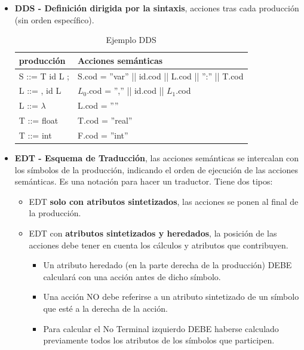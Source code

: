 \documentclass[12pt, twoside, openright]{report} %
\begin{document}
\begin{itemize}
	\item \textbf{DDS - Definición dirigida por la sintaxis}, acciones tras cada producción (sin orden específico).

	      \begin{table}[H]
		      \centering
		      \begin{tabular}{|l|l|}
			      \hline
			      \textbf{producción} & \textbf{Acciones semánticas}                         \\ \hline
			      S ::= T id L ;      & S.cod = ''var'' || id.cod || L.cod || '':'' || T.cod \\ \hline
			      L ::= , id L        & $L_0$.cod = '','' || id.cod || $L_1$.cod             \\ \hline
			      L ::= $\lambda$     & L.cod = ''''                                         \\ \hline
			      T ::= float         & T.cod = ''real''                                     \\ \hline
			      T ::= int           & F.cod = ''int''                                      \\ \hline
		      \end{tabular}
		      \caption{Ejemplo DDS}
	      \end{table}
	\item \textbf{EDT - Esquema de Traducción}, las acciones semánticas se intercalan con los símbolos de la producción, indicando el orden de ejecución de las acciones semánticas. Es una notación para hacer un traductor. Tiene dos tipos:
	      \begin{itemize}
		      \item EDT \textbf{solo con atributos sintetizados}, las acciones se ponen al final de la producción.
		      \item EDT con \textbf{atributos sintetizados y heredados}, la posición de las acciones debe tener en cuenta los cálculos y atributos que contribuyen.
		            \begin{itemize}
			            \item Un atributo heredado (en la parte derecha de la producción) DEBE calculará con una acción antes de dicho símbolo.
			            \item Una acción NO debe referirse a un atributo sintetizado de un símbolo que esté a la derecha de la acción.
			            \item Para calcular el No Terminal izquierdo DEBE haberse calculado previamente todos los atributos de los símbolos que participen.
		            \end{itemize}
	      \end{itemize}
\end{itemize}
\end{document}
